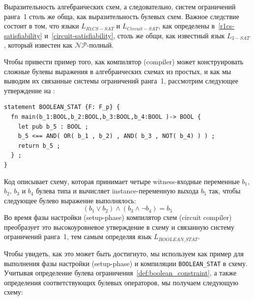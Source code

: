 Выразительность алгебраических схем, а следовательно, систем ограничений ранга~1 столь же обща, как выразительность булевых схем. Важное следствие состоит в том, что языки $L_{R1CS-SAT}$ и $L_{Circuit-SAT}$, как определены в~\ref{r1cs-satisfiability} и~\ref{circuit-satisfiability}, столь же общи, как известный язык $L_{3-SAT}$, который известен как $\mathcal{NP}$-полный.
\begin{example} Чтобы привести пример того, как компилятор (compiler) может конструировать сложные булевы выражения в алгебраических схемах из простых, и как мы выводим их связанные системы ограничений ранга~1, рассмотрим следующее утверждение на :
\begin{lstlisting}
statement BOOLEAN_STAT {F: F_p} {
  fn main(b_1:BOOL,b_2:BOOL,b_3:BOOL,b_4:BOOL )-> BOOL {
    let pub b_5 : BOOL ;
    b_5 <== AND( OR( b_1 , b_2) , AND( b_3 , NOT( b_4) ) ) ;
    return b_5 ;
  } ;
}
\end{lstlisting}
Код описывает схему, которая принимает четыре witness-входные переменные $b_1$, $b_2$, $b_3$ и $b_4$ булева типа и вычисляет instance-переменную выхода $b_5$ так, чтобы следующее булево выражение выполнялось:
$$
\left( b_1 \vee b_2 \right) \wedge (b_3 \wedge \lnot b_4) = b_5
$$
Во время фазы настройки (setup-phase) компилятор схем (circuit compiler) преобразует это высокоуровневое утверждение в схему и связанную систему ограничений ранга~1, тем самым определяя язык $L_{BOOLEAN\_STAT}$.

Чтобы увидеть, как это может быть достигнуто, мы используем  как пример для выполнения фазы настройки (setup-phase) и компиляции \texttt{BOOLEAN\_STAT} в схему. Учитывая определение булева ограничения~\ref{def:boolean_constraint}, а также определения соответствующих булевых операторов, мы получаем следующую схему:
\begin{center}
\end{center}
\end{example}
